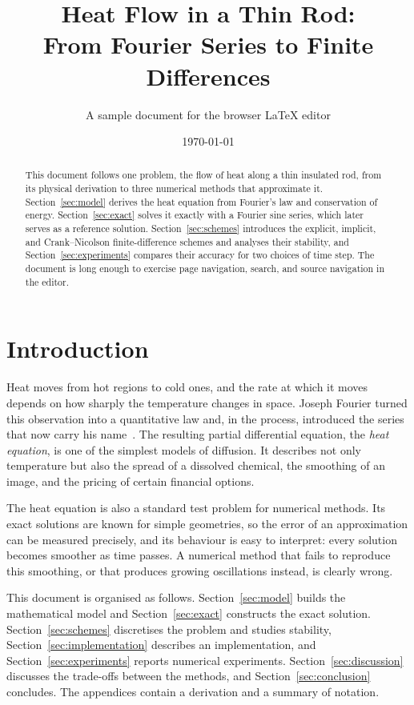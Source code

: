 \documentclass[11pt]{article}
\title{Heat Flow in a Thin Rod:\\ From Fourier Series to Finite Differences}
\author{A sample document for the browser LaTeX editor}
\date{\today}
\theoremstyle{definition}
\theoremstyle{remark}
\begin{document}
\maketitle

\begin{abstract}
This document follows one problem, the flow of heat along a thin insulated rod, from its physical derivation to three numerical methods that approximate it. Section~\ref{sec:model} derives the heat equation from Fourier's law and conservation of energy. Section~\ref{sec:exact} solves it exactly with a Fourier sine series, which later serves as a reference solution. Section~\ref{sec:schemes} introduces the explicit, implicit, and Crank--Nicolson finite-difference schemes and analyses their stability, and Section~\ref{sec:experiments} compares their accuracy for two choices of time step. The document is long enough to exercise page navigation, search, and source navigation in the editor.
\end{abstract}

\tableofcontents

\section{Introduction}\label{sec:introduction}

Heat moves from hot regions to cold ones, and the rate at which it moves depends on how sharply the temperature changes in space. Joseph Fourier turned this observation into a quantitative law and, in the process, introduced the series that now carry his name~\cite{fourier1822}. The resulting partial differential equation, the \emph{heat equation}, is one of the simplest models of diffusion. It describes not only temperature but also the spread of a dissolved chemical, the smoothing of an image, and the pricing of certain financial options.

The heat equation is also a standard test problem for numerical methods. Its exact solutions are known for simple geometries, so the error of an approximation can be measured precisely, and its behaviour is easy to interpret: every solution becomes smoother as time passes. A numerical method that fails to reproduce this smoothing, or that produces growing oscillations instead, is clearly wrong.

This document is organised as follows. Section~\ref{sec:model} builds the mathematical model and Section~\ref{sec:exact} constructs the exact solution. Section~\ref{sec:schemes} discretises the problem and studies stability, Section~\ref{sec:implementation} describes an implementation, and Section~\ref{sec:experiments} reports numerical experiments. Section~\ref{sec:discussion} discusses the trade-offs between the methods, and Section~\ref{sec:conclusion} concludes. The appendices contain a derivation and a summary of notation.
\end{document}
